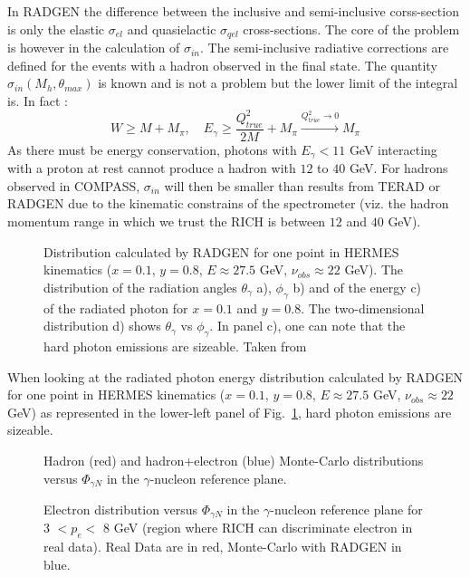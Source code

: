 %
In RADGEN the difference between the inclusive and semi-inclusive corss-section is only the elastic $\sigma_{el}$ and quasielactic $\sigma_{qel}$ cross-sections. The core of the problem is however in the calculation of $\sigma_{in}$. The semi-inclusive radiative corrections are defined for the events with a hadron observed in the final state. The quantity $\sigma_{in}(M_{h},\theta_{max})$ is known and is not a problem but the lower limit of the integral is. In fact :
%
\begin{equation}
    W \geqslant M + M_{\pi},\quad E_{\gamma} \geqslant \frac{Q^2_{true}}{2M}+M_{\pi} \xrightarrow{Q^2_{true} \rightarrow 0} M_{\pi}
\end{equation}
%
As there must be energy conservation, photons with $E_{\gamma} < 11$ GeV interacting with a proton at rest cannot produce a hadron with $12$ to $40$ GeV. For hadrons observed in COMPASS, $\sigma_{in}$ will then be smaller than results from TERAD or RADGEN due to the kinematic constrains of the spectrometer (viz. the hadron momentum range in which we trust the RICH is between $12$ and $40$ GeV).
%
\begin{figure}[htb]
\centerline{}
\caption{Distribution calculated by RADGEN for one point in HERMES kinematics ($x=0.1$, $y=0.8$, $E\approx27.5$ GeV, $\nu_{obs}\approx22$ GeV). The distribution of the radiation angles $\theta_{\gamma}$ a), $\phi_{\gamma}$ b) and of the energy c) of the radiated photon for $x=0.1$ and $y=0.8$. The two-dimensional distribution d) shows $\theta_{\gamma}$ vs $\phi_{\gamma}$. In panel c), one can note that the hard photon emissions are sizeable. Taken from \cite{RADGEN}}\label{fig:RAD}
\end{figure}

When looking at the radiated photon energy distribution calculated by RADGEN for one point in HERMES kinematics ($x=0.1$, $y=0.8$, $E\approx27.5$ GeV, $\nu_{obs}\approx22$ GeV) as represented in the lower-left panel of Fig.~\ref{fig:RAD}, hard photon emissions are sizeable.

\begin{figure}[htb!]
\centerline{}
\caption{Hadron (red) and hadron+electron (blue) Monte-Carlo distributions versus $\Phi_{\gamma N}$ in the $\gamma$-nucleon reference plane.}\label{fig:elprod}
\end{figure}

\begin{figure}[htb!]
\centerline{}
\caption{Electron distribution versus $\Phi_{\gamma N}$ in the $\gamma$-nucleon reference plane for 3 $< p_e <$ 8 GeV (region where RICH can discriminate electron in real data). Real Data are in red, Monte-Carlo with RADGEN in blue.}\label{fig:ph_pl}
\end{figure}

